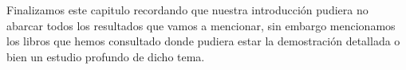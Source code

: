 Finalizamos este capitulo recordando que nuestra introducción pudiera no abarcar todos los resultados que vamos a mencionar, sin embargo mencionamos los libros que hemos consultado donde pudiera  estar la demostración detallada  o bien un estudio profundo de dicho tema.


%
%
%
%
%
%
%
%
%
%
%



